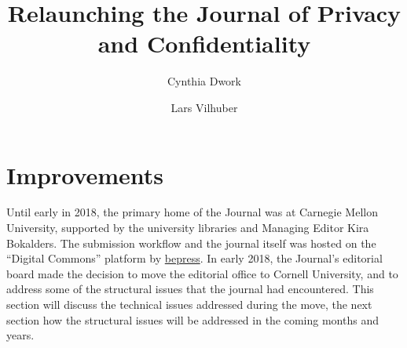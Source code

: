 \documentclass{jpcfinal} %
\begin{document}
\title[Relaunching JPC]{Relaunching the Journal of Privacy and Confidentiality}

\author{Cynthia Dwork}	%
\address{Harvard University}	%
\author{Lars Vilhuber}	%
\address{Cornell University}	%

\maketitle


\section{Improvements}

Until early in 2018, the primary home of the Journal was at Carnegie Mellon University, supported by the university libraries and Managing Editor Kira Bokalders. The submission workflow and the journal itself was hosted on the ``Digital Commons'' platform by \href{https://www.bepress.com}{bepress}. In early 2018, the Journal's editorial board made the decision to move the editorial office to Cornell University, and to address some of the structural issues that the journal had encountered. This section will discuss the technical issues addressed during the move, the next section how the structural issues will be addressed in the coming months and years.
\end{document}
